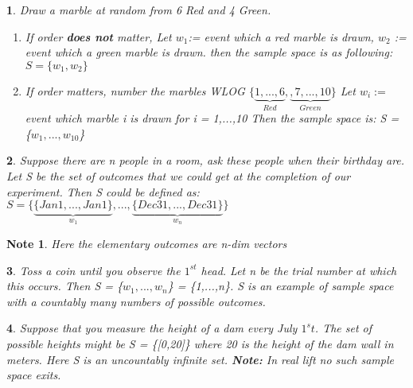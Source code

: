 \documentclass[11pt]{article}
\newtheorem*{note}{Note}
\newtheorem{example}{\framebox{Ex}}[section]
\begin{document}
                \begin{example}
                    Draw a marble at random from 6 Red and 4 Green. 
                    
                    \begin{enumerate}
                        \item If order \textbf{does not} matter,
                            Let $w_1$:= event which a red marble is drawn,
                            $w_2$ := event which a green marble is drawn. then the sample space is as following:
                            $S = \{w_1, w_2\}$
                        \item If order matters, number the marbles WLOG $\{\underbrace{1,...,6}_{Red},\underbrace{,7,...,10}_{Green}\}$
                            Let $w_i:=$ event which marble i is drawn for i = 1,...,10
                            Then the sample space is: S = \{$w_1,...,w_{10}$\}
                    \end{enumerate}
                \end{example}

                \begin{example}
                    Suppose there are n people in a room, ask these people when their birthday are.
                    Let S be the set of outcomes that we could get at the completion of our experiment. 
                    Then S could be defined as: 
                    \\$S = \{\underbrace{\{Jan 1, ..., Jan 1\}}_{w_1},..., \underbrace{\{Dec 31, ..., Dec 31\}}_{w_n}\}$
                \end{example}
                \begin{note}
                    Here the elementary outcomes are n-dim vectors
                \end{note}

                \begin{example}
                    Toss a coin until you observe the $1^{st}$ head. Let n be the trial number at which this occurs.
                    Then S = \{$w_1,...,w_n$\} = \{1,...,n\}. S is an example of sample space with a countably many numbers of possible outcomes.
                \end{example}

                \begin{example}
                    Suppose that you measure the height of a dam every July $1^st$. The set of possible heights might be 
                    S = \{[0,20]\} where 20 is the height of the dam wall in meters.
                    Here S is an uncountably infinite set. \textbf{\textit{Note: }}In real lift no such sample space exits.
                \end{example}
\end{document}
